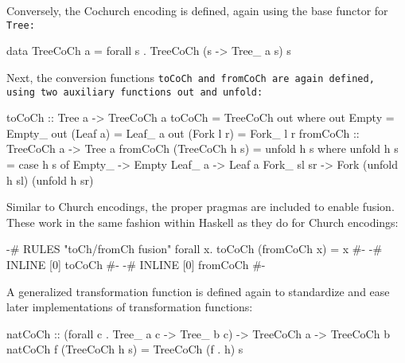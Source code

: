 Conversely, the Cochurch encoding is defined, again using the base functor for \tt{Tree}:
\begin{code}
data TreeCoCh a = forall s . TreeCoCh (s -> Tree_ a s) s
\end{code}

Next, the conversion functions \tt{toCoCh} and \tt{fromCoCh} are again defined, using two auxiliary functions \tt{out} and \tt{unfold}:
\begin{code}
toCoCh :: Tree a -> TreeCoCh a
toCoCh = TreeCoCh out
  where out Empty = Empty_
        out (Leaf a) = Leaf_ a
        out (Fork l r) = Fork_ l r
fromCoCh :: TreeCoCh a -> Tree a
fromCoCh (TreeCoCh h s) = unfold h s
  where unfold h s = case h s of
          Empty_ -> Empty
          Leaf_ a -> Leaf a
          Fork_ sl sr -> Fork (unfold h sl) (unfold h sr)
\end{code}
Similar to Church encodings, the proper pragmas are included to enable fusion.
These work in the same fashion within Haskell as they do for Church encodings:
\begin{code}
{-# RULES "toCh/fromCh fusion" forall x. toCoCh (fromCoCh x) = x #-}
{-# INLINE [0] toCoCh #-}
{-# INLINE [0] fromCoCh #-}
\end{code}
A generalized transformation function is defined again to standardize and ease later implementations of transformation functions:
\begin{code}
natCoCh :: (forall c . Tree_ a c -> Tree_ b c) -> TreeCoCh a -> TreeCoCh b
natCoCh f (TreeCoCh h s) = TreeCoCh (f . h) s
\end{code}
